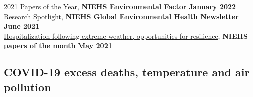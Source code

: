 \href{https://factor.niehs.nih.gov/2022/1/papers/papers-of-the-year/index.htm}{2021 Papers of the Year}, \textbf{NIEHS Environmental Factor} \hfill \textbf{January 2022}\\
\href{https://www.niehs.nih.gov/research/programs/geh/geh_newsletter/2021/6/spotlight/hurricanes_and_tropical_cyclones_associated_with_increased_hospitalization_rates_in_older_adults.cfm}{Research Spotlight}, \textbf{NIEHS Global Environmental Health Newsletter} \hfill \textbf{June 2021}\\
\href{https://factor.niehs.nih.gov/2021/5/papers/dert/index.htm?utm_source=efactor-newsletter&utm_medium=email&utm_campaign=efactor-newsletter-2021-May#a3}{Hospitalization following extreme weather, opportunities for resilience}, \textbf{NIEHS papers of the month} \hfill \textbf{May 2021}

\subsection*{COVID-19 excess deaths, temperature and air pollution}

